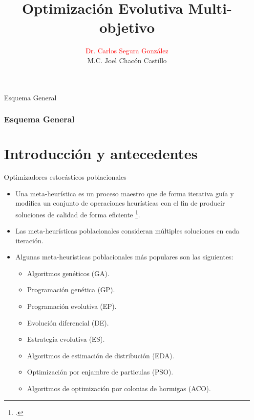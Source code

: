 \documentclass{beamer}
\title[Your Short Title]{Optimización Evolutiva Multi-objetivo}
\author{\textcolor{red}{Dr. Carlos Segura González} \\ M.C. Joel Chacón Castillo}
\institute{Centro de Investigación de Matemáticas}
\begin{document}
\begin{frame}
  \titlepage
\end{frame}

\begin{frame}{Esquema General}
\frametitle{Esquema General}
\tableofcontents
\end{frame}


\section{Introducción y antecedentes}



\begin{frame}{Optimizadores estocásticos poblacionales}
    \begin{itemize}
    \scriptsize
    \justifying
        \item Una meta-heurística es un proceso maestro que de forma iterativa guía y modifica un conjunto de operaciones heurísticas con el fin de producir soluciones de calidad de forma eficiente \footcite{voss2012meta}.
        \item Las meta-heurísticas poblacionales consideran múltiples soluciones en cada iteración.
        \item Algunas meta-heurísticas poblacionales más populares son las siguientes:
        \begin{itemize}
        \scriptsize
            \item Algoritmos genéticos (GA).
            \item Programación genética (GP).
            \item Programación evolutiva (EP).
            \item Evolución diferencial (DE).
            \item Estrategia evolutiva (ES).
            \item Algoritmos de estimación de distribución (EDA).
            \item Optimización por enjambre de particulas (PSO).
            \item Algoritmos de optimización por colonias de hormigas (ACO).
        \end{itemize}{}
    \end{itemize}{}
\end{frame}{}
\end{document}
